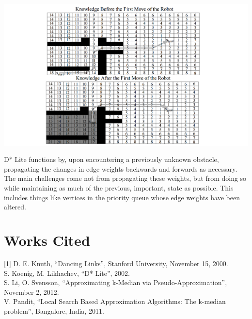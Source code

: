 \documentclass[11pt]{article}
\begin{document}
\begin{center}
    \includegraphics[scale=0.15]{dstarlite}
\end{center}

D* Lite functions by, upon encountering a previously unknown obstacle, propagating the changes in edge weights backwards and forwards as necessary. The main challenges come not from propagating these weights, but from doing so while maintaining as much of the previous, important, state as possible. This includes things like vertices in the priority queue whose edge weights have been altered. 

\section*{Works Cited}

[1] D. E. Knuth, ``Dancing Links'', Stanford University, November 15, 2000.\\\relax
[2] S. Koenig, M. Likhachev, ``D* Lite'', 2002.\\\relax
[3] S. Li, O. Svensson, ``Approximating k-Median via Pseudo-Approximation'', November 2, 2012.\\\relax
[4] V. Pandit, ``Local Search Based Approximation Algorithms: The k-median problem'', Bangalore, India, 2011.\\\relax
\end{document}
